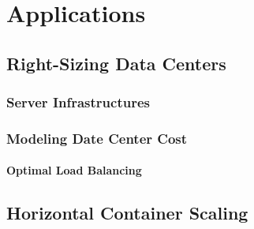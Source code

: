 
\chapter{Applications}\label{chapter:applications}

\section{Right-Sizing Data Centers}

\subsection{Server Infrastructures}

\subsection{Modeling Date Center Cost}

\subsubsection{Optimal Load Balancing}

\section{Horizontal Container Scaling}

